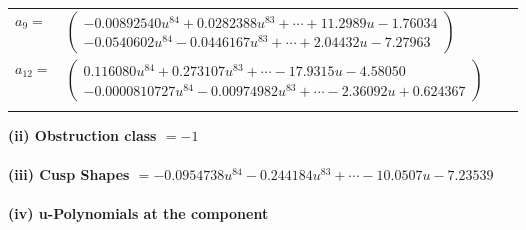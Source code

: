 \documentclass[1p]{elsarticle_modified}
\theoremstyle{definition}
\begin{document}
\begin{tabular}{m{7pt} m{180pt} m{7pt} m{180pt} }
\flushright $a_{9}=$&$\begin{pmatrix}-0.00892540 u^{84}+0.0282388 u^{83}+\cdots+11.2989 u-1.76034\\-0.0540602 u^{84}-0.0446167 u^{83}+\cdots+2.04432 u-7.27963\end{pmatrix}$ \\
\flushright $a_{12}=$&$\begin{pmatrix}0.116080 u^{84}+0.273107 u^{83}+\cdots-17.9315 u-4.58050\\-0.0000810727 u^{84}-0.00974982 u^{83}+\cdots-2.36092 u+0.624367\end{pmatrix}$\\&\end{tabular}
\flushleft \textbf{(ii) Obstruction class $= -1$}\\~\\
\flushleft \textbf{(iii) Cusp Shapes $= -0.0954738 u^{84}-0.244184 u^{83}+\cdots-10.0507 u-7.23539$}\\~\\
\newpage\renewcommand{\arraystretch}{1}
\flushleft \textbf{(iv) u-Polynomials at the component}\newline \\
\end{document}
